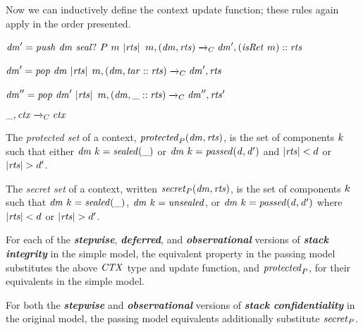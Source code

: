 \documentclass[acmsmall,review,anonymous]{acmart}\settopmatter{printfolios=true,printccs=false,printacmref=false}
\begin{document}
{Now we can inductively define the context update function; these rules again apply in the order
presented. \ifspace{}\fi

            {\(\mathit{dm}' = \mathit{push} ~ \mathit{dm} ~ \mathit{seal?} ~ P ~ m ~ |\mathit{rts}|\)}
            {\(m,(\mathit{dm},\mathit{rts}) \xrightarrow{}_C \mathit{dm}',(\mathit{isRet} ~ m)::\mathit{rts}\)}

\vspace*{-1ex}
            {\(\mathit{dm}' = \mathit{pop} ~ \mathit{dm} ~ |\mathit{rts}|\)}
            {\(m,(\mathit{dm},\mathit{tar}::\mathit{rts}) \xrightarrow{}_C \mathit{dm}',\mathit{rts}\)}

\vspace*{-1ex}
              {\(\mathit{dm}'' = \mathit{pop} ~ \mathit{dm}' ~ |\mathit{rts}|\)}
              {\(m,(\mathit{dm},\mbox{\_}::\mathit{rts}) \xrightarrow{}_C \mathit{dm}'',\mathit{rts}'\)}

\vspace*{-5ex}
\judgment[ Default]
         {}
         {\(\mbox{\_},\mathit{ctx} \xrightarrow{}_C \mathit{ctx}\)}

 The \emph{protected set} of a context, \(\mathit{protected}_P(\mathit{dm},\mathit{rts})\),
is the set of components \(k\) such that either \(\mathit{dm} ~ k = \mathit{sealed(\mbox{\_})}\)
or \(\mathit{dm} ~ k = \mathit{passed(d,d')}\) and \(|\mathit{rts}| < d\) or
\(|\mathit{rts}| > d'\).

 The \emph{secret set} of a context, written \(\mathit{secret}_P(\mathit{dm},\mathit{rts})\),
is the set of components \(k\) such that
\(\mathit{dm} ~ k = \mathit{sealed(\mbox{\_})}\), \(\mathit{dm} ~ k = \mathit{unsealed}\), or
\(\mathit{dm} ~ k = \mathit{passed(d,d')}\)
where \(|\mathit{rts}| < d\) or \(|\mathit{rts}| > d'\).

For each of the \textbf{\em stepwise}, \textbf{\em deferred}, and \textbf{\em observational} versions of
\textbf{\em stack integrity} in the simple model, the equivalent property in the
passing model substitutes the above \(\mathit{CTX}\) type and update
function, and \(\mathit{protected}_P\), for their equivalents in the simple model.

For both the \textbf{\em stepwise} and \textbf{\em observational} versions of \textbf{\em stack confidentiality} in
the original model, the passing model equivalents additionally substitute \(\mathit{secret}_P\).

}
\end{document}

